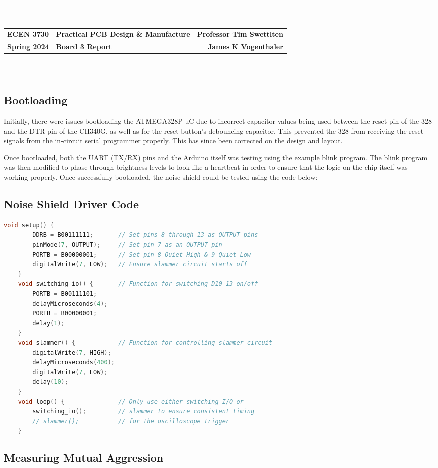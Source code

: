 \documentclass{article}
\newcommand*{\Indent}{\hspace*{1cm}}
\newcommand*{\Header}{
    \rule{\textwidth}{2.5pt}\\
    \begin{tabularx}{\textwidth}{>{\bfseries}l >{\bfseries\centering}X >{\bfseries}r}
    ECEN 3730   & Practical PCB Design \& Manufacture & Professor Tim Swettlten\\
    Spring 2024 & Board 3 Report                      & James K Vogenthaler
    \end{tabularx}\\
    \rule{\textwidth}{1.5pt}

    \vspace*{-5mm}
}
\begin{document}
\Header

\subsection{Bootloading}
Initially, there were issues bootloading the ATMEGA328P uC due to incorrect capacitor values being used between the reset pin of the 328 and the DTR pin of the CH340G, as well as for the reset button's debouncing capacitor. This prevented the 328 from receiving the reset signals from the in-circuit serial programmer properly. This has since been corrected on the design and layout.

\Indent Once bootloaded, both the UART (TX/RX) pins and the Arduino itself was testing using the example blink program. The blink program was then modified to phase through brightness levels to look like a heartbeat in order to ensure that the logic on the chip itself was working properly. Once successfully bootloaded, the noise shield could be tested using the code below:

\subsection{Noise Shield Driver Code}
\begin{lstlisting}[language=c]
    void setup() { 
        DDRB = B00111111;       // Set pins 8 through 13 as OUTPUT pins
        pinMode(7, OUTPUT);     // Set pin 7 as an OUTPUT pin
        PORTB = B00000001;      // Set pin 8 Quiet High & 9 Quiet Low
        digitalWrite(7, LOW);   // Ensure slammer circuit starts off
    } 
    void switching_io() {       // Function for switching D10-13 on/off
        PORTB = B00111101;      
        delayMicroseconds(4); 
        PORTB = B00000001; 
        delay(1); 
    }
    void slammer() {            // Function for controlling slammer circuit
        digitalWrite(7, HIGH); 
        delayMicroseconds(400); 
        digitalWrite(7, LOW); 
        delay(10); 
    }
    void loop() {               // Only use either switching I/O or
        switching_io();         // slammer to ensure consistent timing
        // slammer();           // for the oscilloscope trigger
    }
\end{lstlisting}

\subsection{Measuring Mutual Aggression}
\end{document}
